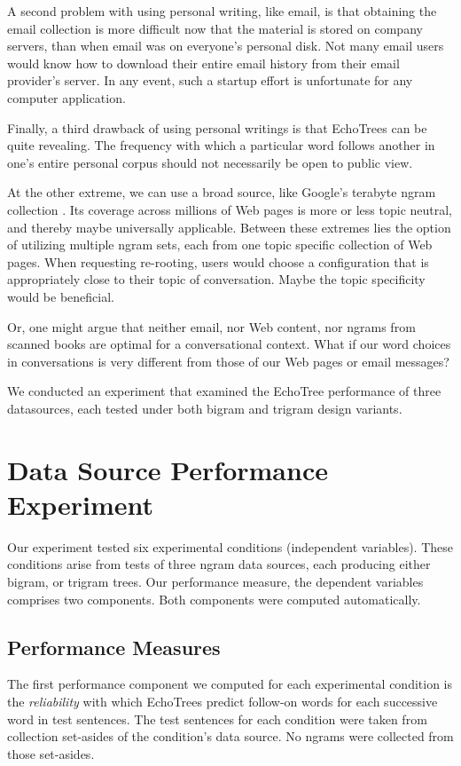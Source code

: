 \documentclass{sigchi}
\begin{document}
A second problem with using personal writing, like email, is that
obtaining the email collection is more difficult now that the material
is stored on company servers, than when email was on everyone's
personal disk. Not many email users would know how to download their
entire email history from their email provider's server. In any event,
such a startup effort is unfortunate for any computer application.

Finally, a third drawback of using personal writings is that EchoTrees
can be quite revealing. The frequency with which a particular word
follows another in one's entire personal corpus should not necessarily
be open to public view.

At the other extreme, we can use a broad source, like Google's
terabyte ngram collection \cite{google1T}. Its coverage across
millions of Web pages is more or less topic neutral, and thereby maybe
universally applicable. Between these extremes lies the option of
utilizing multiple ngram sets, each from one topic specific collection
of Web pages. When requesting re-rooting, users would choose a
configuration that is appropriately close to their topic of
conversation. Maybe the topic specificity would be beneficial.

Or, one might argue that neither email, nor Web content, nor ngrams
from scanned books \cite{anc} are optimal for a conversational
context. What if our word choices in conversations is very different
from those of our Web pages or email messages?

We conducted an experiment that examined the EchoTree performance of
three datasources, each tested under both bigram and trigram design
variants.

\section{Data Source Performance Experiment}

Our experiment tested six experimental conditions (independent
variables). These conditions arise from tests of three ngram data
sources, each producing either bigram, or trigram trees. Our
performance measure, the dependent variables comprises two
components. Both components were computed automatically.

\subsection{Performance Measures}

The first performance component we computed for each experimental
condition is the {\em reliability} with which EchoTrees predict
follow-on words for each successive word in test sentences. The test
sentences for each condition were taken from collection set-asides of
the condition's data source. No ngrams were collected from those
set-asides. 
\end{document}
